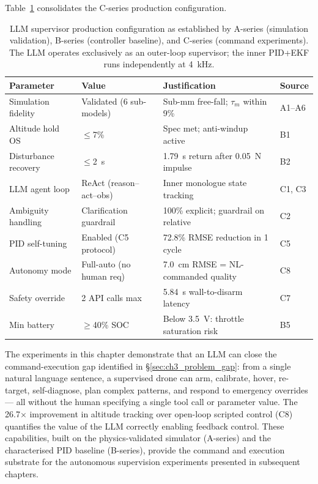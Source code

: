 Table~\ref{tab:ch3_production_config} consolidates the C-series production
configuration.

\begin{table}[ht]
  \caption{LLM supervisor production configuration as established by
    A-series (simulation validation), B-series (controller baseline), and
    C-series (command experiments). The LLM operates exclusively as an
    outer-loop supervisor; the inner PID+EKF runs independently at 4~kHz.}
  \label{tab:ch3_production_config}
  \centering
  \small
  \begin{tabular}{llll}
    \toprule
    Parameter & Value & Justification & Source \\
    \midrule
    Simulation fidelity   & Validated (6 sub-models) & Sub-mm free-fall; $\tau_m$ within 9\% & A1--A6 \\
    Altitude hold OS      & $\leq$7\%                & Spec met; anti-windup active          & B1 \\
    Disturbance recovery  & $\leq$2~s                & 1.79~s return after 0.05~N impulse    & B2 \\
    LLM agent loop        & ReAct (reason--act--obs) & Inner monologue state tracking        & C1, C3 \\
    Ambiguity handling    & Clarification guardrail  & 100\% explicit; guardrail on relative & C2 \\
    PID self-tuning       & Enabled (C5 protocol)    & 72.8\% RMSE reduction in 1 cycle     & C5 \\
    Autonomy mode         & Full-auto (no human req) & 7.0~cm RMSE = NL-commanded quality   & C8 \\
    Safety override       & 2 API calls max          & 5.84~s wall-to-disarm latency         & C7 \\
    Min battery           & $\geq$40\% SOC           & Below 3.5~V: throttle saturation risk & B5 \\
    \bottomrule
  \end{tabular}
\end{table}

The experiments in this chapter demonstrate that an LLM can close the
command-execution gap identified in \S\ref{sec:ch3_problem_gap}: from a
single natural language sentence, a supervised drone can arm, calibrate,
hover, re-target, self-diagnose, plan complex patterns, and respond to
emergency overrides --- all without the human specifying a single tool call
or parameter value. The 26.7$\times$ improvement in altitude tracking over
open-loop scripted control (C8) quantifies the value of the LLM correctly
enabling feedback control. These capabilities, built on the physics-validated
simulator (A-series) and the characterised PID baseline (B-series), provide
the command and execution substrate for the autonomous supervision experiments
presented in subsequent chapters.
